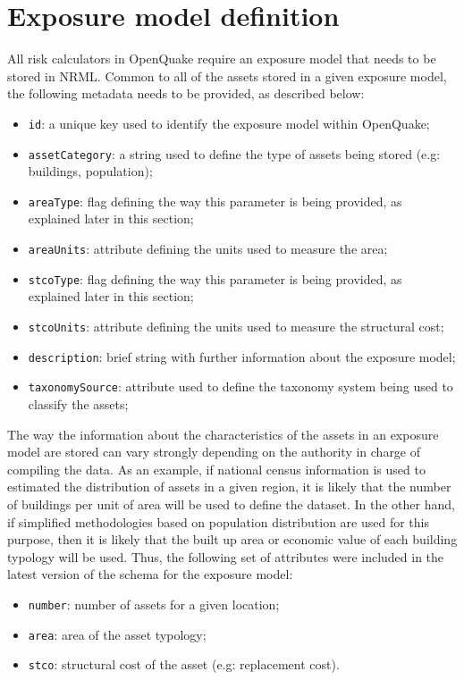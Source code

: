 \section{Exposure model definition}
All risk calculators in OpenQuake require an exposure model that needs to be stored in NRML. Common to all of the assets stored in a given exposure model, the following metadata needs to be provided, as described below: 

\begin{itemize}
\item  \Verb+id+: a unique key used to identify the exposure model within OpenQuake;
\item  \Verb+assetCategory+: a string used to define the type of assets being stored (e.g: buildings, population);
\item  \Verb+areaType+: flag defining the way this parameter is being provided, as explained later in this section; 
\item  \Verb+areaUnits+: attribute defining the units used to measure the area; 
\item  \Verb+stcoType+: flag defining the way this parameter is being provided, as explained later in this section; 
\item  \Verb+stcoUnits+: attribute defining the units used to measure the structural cost;
\item  \Verb+description+: brief string with further information about the exposure model;
\item  \Verb+taxonomySource+: attribute used to define the taxonomy system being used to classify the assets;
\end{itemize}

The way the information about the characteristics of the assets in an exposure model are  stored can vary strongly depending on the authority in charge of compiling the data. As an example, if national census information is used to estimated the distribution of assets in a given region, it is likely that the number of buildings per unit of area will be used to define the dataset. In the other hand, if simplified methodologies based on population distribution are used for this purpose, then it is likely that the built up area or economic value of each building typology will be used. Thus, the following set of attributes were included in the latest version of the schema for the exposure model:

\begin{itemize}
\item  \Verb+number+: number of assets for a given location;
\item  \Verb+area+: area of the asset typology;
\item  \Verb+stco+: structural cost of the asset (e.g: replacement cost). 
\end{itemize}

